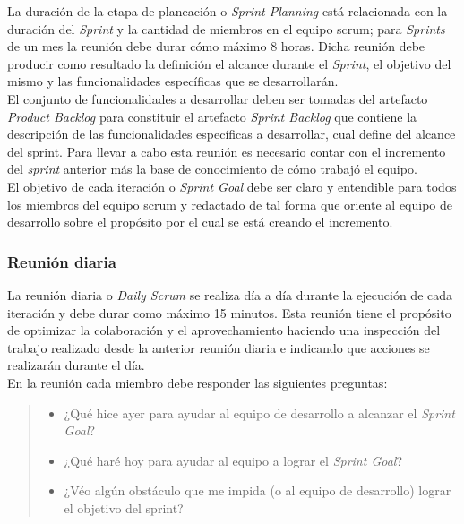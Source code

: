  \noindent La duración de la etapa de planeación o {\it Sprint Planning} está 
 relacionada con la duración del {\it Sprint} y la cantidad de miembros en el equipo 
 scrum; para {\it Sprints} de un mes la reunión debe durar cómo máximo 8 horas. Dicha
 reunión debe producir como resultado la definición el alcance durante el {\it Sprint},
 el objetivo del mismo y las funcionalidades específicas que se desarrollarán.\\

 \noindent El conjunto de funcionalidades a desarrollar deben ser tomadas del artefacto {\it Product Backlog} para constituir el artefacto {\it Sprint Backlog} que contiene 
 la descripción de las funcionalidades específicas a desarrollar, cual define del 
 alcance del sprint. Para llevar a cabo esta reunión es necesario contar con el 
 incremento del {\it sprint} anterior más la base de conocimiento de cómo trabajó 
 el equipo.\\



 \noindent El objetivo de cada iteración o {\it Sprint Goal} debe ser claro y 
 entendible para todos los miembros del equipo scrum y redactado de tal forma que 
 oriente al equipo de desarrollo sobre el propósito por el cual se está creando el
 incremento.

\subsubsection{Reunión diaria}

 La reunión diaria o {\it Daily Scrum} se realiza día a día durante la ejecución de cada iteración
 y debe durar como máximo 15 minutos. Esta reunión tiene el propósito de optimizar la colaboración
 y el aprovechamiento haciendo una inspección del trabajo realizado desde la anterior reunión diaria
 e indicando que acciones se realizarán durante el día.\\

 En la reunión cada miembro debe responder las siguientes preguntas:

    \begin{quote}
    \begin{itemize}
    \item ¿Qué hice ayer para ayudar al equipo de desarrollo a alcanzar el {\it Sprint Goal}?
    \item ¿Qué haré hoy para ayudar al equipo a lograr el {\it Sprint Goal}?
    \item ¿Véo algún obstáculo que me impida (o al equipo de desarrollo) lograr el objetivo
           del sprint?
    \end{itemize}
    \end{quote}

